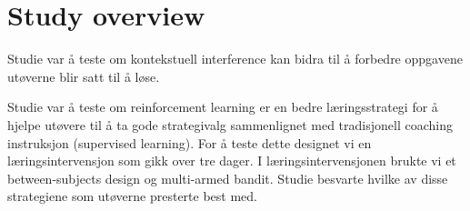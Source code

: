\newcommand{\RNum}[1]{\uppercase\expandafter{\romannumeral #1\relax}}

\section{Study overview}
Studie \RNum{1} var å teste om kontekstuell interference kan bidra til å forbedre oppgavene utøverne blir satt til å løse. 

Studie \RNum{2} var å teste om reinforcement learning er en bedre læringsstrategi for å hjelpe utøvere til å ta gode strategivalg sammenlignet med tradisjonell coaching instruksjon (supervised learning). For å teste dette designet vi en læringsintervensjon som gikk over tre dager. I læringsintervensjonen brukte vi et between-subjects design og multi-armed bandit.  Studie \RNum{2} besvarte hvilke av disse strategiene som utøverne presterte best med. 


